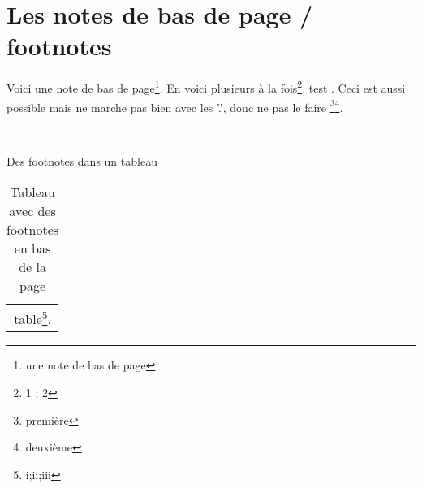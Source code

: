 \section{Les notes de bas de page / footnotes}

Voici une note de bas de page\footnote{une note de bas de page}. En voici plusieurs à la fois\footnote{1 ; 2}. test . Ceci est aussi possible mais ne marche pas bien avec les '.', donc ne pas le faire \footnote{première}\footnote{deuxième}.

~~

Des footnotes dans un tableau 

\begin{table}[h]
	\centering
    \begin{tabular}{c} 
        table\footnote{i;ii;iii}.
    \end{tabular}
    \caption{Tableau avec des footnotes en bas de la page}
\end{table}


